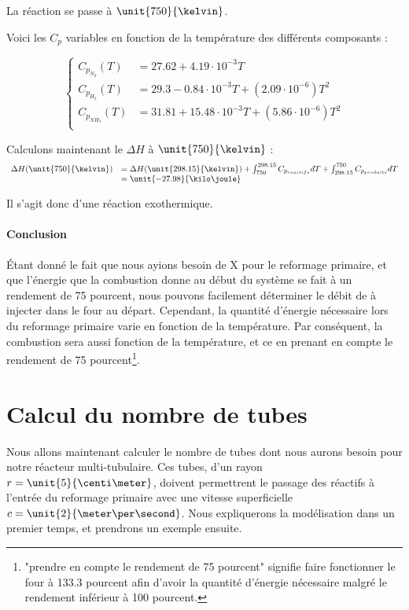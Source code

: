 La réaction se passe à $\unit{750}{\kelvin}$.
						
Voici les $C_p$ variables en fonction de la température des différents composants\cite{hc-table} :

$$
	\left\{
		\begin{array}{rl}
			C_{p_{N_2}}(T) 	&= 27.62 + 4.19\cdot10^{-3}T \\
			C_{p_{H_2}}(T)	&= 29.3 - 0.84\cdot10^{-3}T + (2.09\cdot10^{-6})T^2\\
			C_{p_{NH_3}}(T) 	&= 31.81 + 15.48\cdot10^{-3}T + (5.86\cdot10^{-6})T^2 \\
		\end{array}
	\right.
$$
					
Calculons maintenant le $\Delta H$ à $\unit{750}{\kelvin}$ :			
$$
	\begin{array}{rl}
		 	 \Delta H(\unit{750}{\kelvin})	&=  \Delta H(\unit{298.15}{\kelvin}) 
																							+ \int_{750}^{298.15} C_{p_{reactifs}} dT + \int_{298.15}^{750} C_{p_{produits}} dT \\
																				&=  \unit{-27.98}{\kilo\joule}
	\end{array}
$$	
	
Il s'agit donc d'une réaction exothermique.

\paragraph{Conclusion}
\'Etant donné le fait que nous ayions besoin de \unit{X}{\kilo\joule} pour le reformage primaire, et que l'énergie
que la combustion donne au début du système se fait à un rendement de 75 pourcent, nous pouvons facilement déterminer
le débit de  à injecter dans le four au départ. Cependant, la quantité d'énergie nécessaire lors du
reformage primaire varie en fonction de la température. Par conséquent, la combustion sera aussi fonction de la température,
et ce en prenant en compte le rendement de 75 pourcent\footnote{"prendre en compte le rendement de 75 pourcent" signifie faire
fonctionner le four à 133.3 pourcent afin d'avoir la quantité d'énergie nécessaire malgré le rendement inférieur 
à 100 pourcent.}.


\section{Calcul du nombre de tubes}
Nous allons maintenant calculer le nombre de tubes dont nous aurons besoin
pour notre réacteur multi-tubulaire. Ces tubes, d'un rayon $r = \unit{5}{\centi\meter}$,
doivent permettrent le passage des réactifs à l'entrée du reformage primaire avec une
vitesse superficielle $c = \unit{2}{\meter\per\second}$. 
Nous expliquerons la modélisation dans un premier temps, et prendrons un exemple ensuite.

